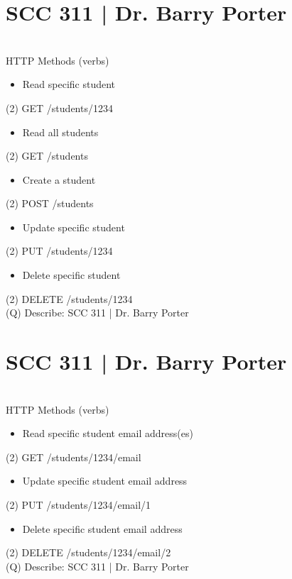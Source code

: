 \documentclass[12pt]{article}
\begin{document}
\section{SCC 311 | Dr. Barry Porter}
\\
HTTP Methods (verbs)\\
\begin{itemize}
  \item Read specific student
\end{itemize}(2)
GET /students/1234\\
\begin{itemize}
  \item Read all students
\end{itemize}(2)
GET /students\\
\begin{itemize}
  \item Create a student
\end{itemize}(2)
POST /students\\
\begin{itemize}
  \item Update specific student
\end{itemize}(2)
PUT /students/1234\\
\begin{itemize}
  \item Delete specific student
\end{itemize}(2)
DELETE /students/1234\\
\clearpage
(Q)
Describe: SCC 311 | Dr. Barry Porter
\clearpage
\section{SCC 311 | Dr. Barry Porter}
\\
HTTP Methods (verbs)\\
\begin{itemize}
  \item Read specific student email address(es)
\end{itemize}(2)
GET /students/1234/email\\
\begin{itemize}
  \item Update specific student email address
\end{itemize}(2)
PUT /students/1234/email/1\\
\begin{itemize}
  \item Delete specific student email address
\end{itemize}(2)
DELETE /students/1234/email/2\\
\clearpage
(Q)
Describe: SCC 311 | Dr. Barry Porter
\clearpage
\end{document}
